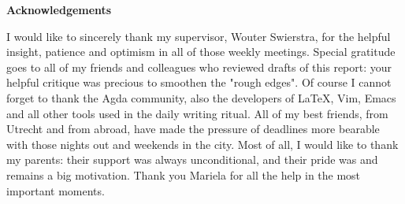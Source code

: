 \clearpage



{\centering \textbf{Acknowledgements}\\[5mm]}

I would like to sincerely thank my supervisor, Wouter Swierstra, for
the helpful insight, patience and optimism in all of those weekly meetings.
Special gratitude goes to all of my friends and colleagues who
reviewed drafts of this report: your helpful critique was precious to smoothen the "rough edges".
Of course I cannot forget to thank the Agda community, also
the developers of LaTeX, Vim, Emacs and all other tools used in the daily writing ritual.
All of my best friends, from Utrecht and from abroad, have made the
pressure of deadlines more bearable with those nights out and weekends in the city.
Most of all, I would like to thank my parents: their support was always unconditional,
and their pride was and remains a big motivation.
Thank you Mariela for all the help in the most important moments.

